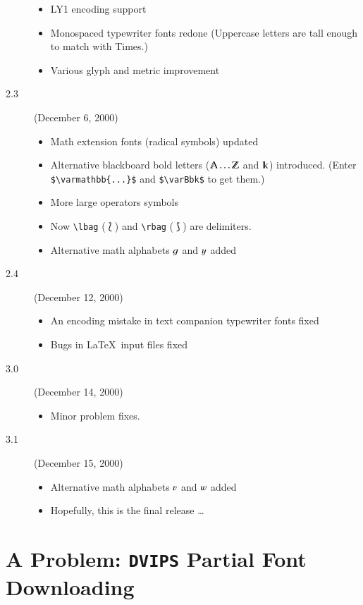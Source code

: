 \documentclass[11pt]{article}
\begin{document}
\begin{description}
     \begin{itemize}
     \item LY1 encoding support
     \item Monospaced typewriter fonts redone (Uppercase letters are tall enough to match with Times.)
     \item Various glyph and metric improvement
     \end{itemize}
\item[2.3] (December 6, 2000)
     \begin{itemize}
     \item Math extension fonts (radical symbols) updated
     \item Alternative blackboard bold letters ($\varmathbb{A}\ldots\varmathbb{Z}$ and $\varBbbk$)
           introduced. (Enter \verb|$\varmathbb{...}$| and \verb|$\varBbk$| to get them.)
     \item More large operators symbols
     \item Now \verb|\lbag| ($\lbag$) and \verb|\rbag| ($\rbag$) are
          delimiters.
     \item Alternative math alphabets $\varg$ and $\vary$ added
     \end{itemize}
\item[2.4] (December 12, 2000)
     \begin{itemize}
     \item An encoding mistake in text companion typewriter fonts fixed
     \item Bugs in \LaTeX\ input files fixed
     \end{itemize}
\item[3.0] (December 14, 2000)
     \begin{itemize}
     \item Minor problem fixes.
     \end{itemize}
\item[3.1] (December 15, 2000)
     \begin{itemize}
     \item Alternative math alphabets $\varv$ and $\varw$ added
     \item Hopefully, this is the final release \ldots
     \end{itemize}
\end{description}

\section{A Problem: \texttt{DVIPS} Partial Font Downloading}
\end{document}
